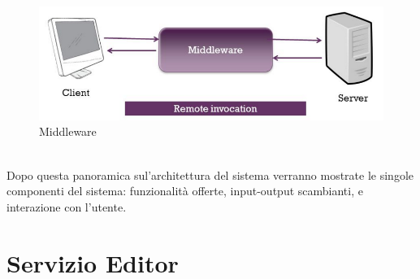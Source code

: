 \\
\begin{figure}[htb]
 \centering
 \includegraphics[width=0.8\linewidth]{images/chapter_architettura_sistema/as_middleware.png}\hfill
 \caption[Middleware]{Middleware}
 \label{fig:as_middleware}
\end{figure}
\\
Dopo questa panoramica sul’architettura del sistema verranno mostrate le singole componenti del sistema: funzionalità offerte, input-output scambianti, e interazione con l’utente. 

\section{Servizio Editor}
\label{sec:chapter_architettura_sistema_il_servizio_editor}

